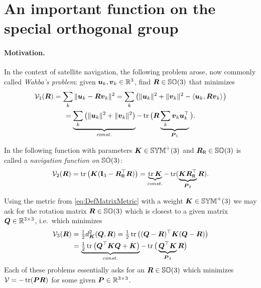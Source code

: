 \section{An important function on the special orthogonal group}\label{sec:AppendixAttitudePotential}
\paragraph{Motivation.}
In the context of satellite navigation, the following problem \cite{Wahba:WahbaProblem} arose, now commonly called \textit{Wahba's problem}: given $\tuple{u}_k, \tuple{v}_k \in \RealNum^3$, find $\R \in \SpecialOrthogonalGroup(3)$ that minimizes
\begin{multline}
 \potentialEnergy_1(\R) = \sum_k \norm{\tuple{u}_k - \R \tuple{v}_k}^2
 = \sum_k \big( \norm{\tuple{u}_k}^2 + \norm{\tuple{v}_k}^2 - \sProd{\tuple{u}_k}{\R \tuple{v}_k} \big)
\\
 = \underbrace{\sum_k \big( \norm{\tuple{u}_k}^2 + \norm{\tuple{v}_k}^2 \big)}_{\const} - \tr\big( \R \underbrace{\sum_k \tuple{v}_k \tuple{u}_k^\top}_{\mat{P}_1} \big).
\end{multline}

In \cite{Koditschek:TotalEnergy} the following function with parameters $\mat{K}\in\SymMatP(3)$ and $\RR\in\SpecialOrthogonalGroup(3)$ is called a \textit{navigation function on} $\SpecialOrthogonalGroup(3)$:
\begin{align}
 \potentialEnergy_2(\R) = \tr\big(\mat{K}(\idMat[3] - \RR^\top\R)\big) = \underbrace{\tr\mat{K}}_{\const} - \tr(\underbrace{\mat{K}\RR^\top}_{\mat{P}_2}\R).
\end{align}

Using the metric from \eqref{eq:DefMatrixMetric} with a weight $\mat{K}\in\SymMatP(3)$ we may ask for the rotation matrix $\R \in \SpecialOrthogonalGroup(3)$ which is closest to a given matrix $\mat{Q}\in\RealNum^{3\times3}$, i.e.\ which minimizes
\begin{multline}
 \potentialEnergy_3(\R) = \tfrac{1}{2} \metricSq[\mat{K}]{\mat{Q}}{\R} 
 = \tfrac{1}{2} \tr\big( (\mat{Q}-\R)^\top \mat{K} (\mat{Q}-\R) \big)
\\
 = \underbrace{\tfrac{1}{2} \tr\big( \mat{Q}^\top \mat{K} \mat{Q} + \mat{K} \big)}_{\const} - \tr\big( \underbrace{\mat{Q}^\top \mat{K}}_{\mat{P}_3} \R \big)
\end{multline}
Each of these problems essentially asks for an $\R\in\SpecialOrthogonalGroup(3)$ which minimizes $\potentialEnergy = -\tr(\mat{P} \R)$ for some given $\mat{P}\in\RealNum^{3\times3}$.

